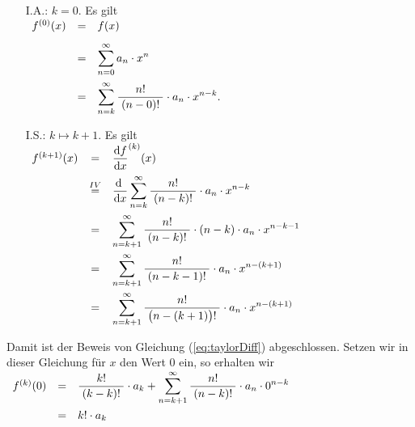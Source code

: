 \begin{enumerate}
\item[I.A.:] $k = 0$. \quad Es gilt \\[0.3cm]
              \hspace*{1.3cm}
              $
              \begin{array}[t]{lcl}              
              f^{(0)}(x) & = & f(x) \\[0.3cm]
                         & = & \displaystyle\sum\limits_{n=0}^\infty a_n \cdot x^{n} \\[0.5cm]
                         & = & \displaystyle\sum\limits_{n=k}^\infty \displaystyle\frac{\;\displaystyle n!\;}{\;\displaystyle(n-0)!\;} \cdot a_n \cdot x^{n-k}.
              \end{array}
              $ 
\item[I.S.:] $k \mapsto k + 1$.  \quad Es gilt 
             \\[0.3cm]
             \hspace*{1.3cm}
             $
             \begin{array}[t]{lcl}
             f^{(k+1)}(x) & = & \displaystyle\frac{\textrm{d}f}{\textrm{d}x}^{(k)}(x) \\[0.3cm]
             & \stackrel{IV}{=} & 
               \displaystyle \displaystyle\frac{\textrm{d}\;}{\textrm{d}x} \sum\limits_{n=k}^\infty \displaystyle\frac{\;\displaystyle n!\;}{\;\displaystyle(n-k)!\;} \cdot a_n \cdot x^{n-k} 
             \\[0.5cm]
             & = & \displaystyle\sum\limits_{n=k+1}^\infty \displaystyle\frac{\;\displaystyle n!\;}{\;\displaystyle(n-k)!\;} \cdot (n-k) \cdot a_n \cdot x^{n-k-1} 
                   \\[0.5cm]
             & = & \displaystyle\sum\limits_{n=k+1}^\infty \displaystyle\frac{\;\displaystyle n!\;}{\;\displaystyle(n-k-1)!\;} \cdot a_n \cdot x^{n-(k+1)} 
                   \\[0.5cm]
             & = & \displaystyle\sum\limits_{n=k+1}^\infty \displaystyle\frac{\;\displaystyle n!\;}{\;\displaystyle\bigl(n-(k+1)\bigr)!\;} \cdot a_n \cdot x^{n-(k+1)} 
             \end{array}
             $
\end{enumerate}
Damit ist der Beweis von Gleichung (\ref{eq:taylorDiff}) abgeschlossen.
Setzen wir in dieser Gleichung f\"ur $x$ den Wert $0$ ein, so erhalten wir 
\\[0.3cm]
\hspace*{1.3cm}
$
\begin{array}[t]{lcl}
f^{(k)}(0) & = & \displaystyle\frac{\;\displaystyle k!\;}{\;\displaystyle(k-k)!\;} \cdot a_k  + 
                 \sum\limits_{n=k+1}^\infty \displaystyle\frac{\;\displaystyle n!\;}{\;\displaystyle(n-k)!\;} \cdot a_n \cdot 0^{n-k} 
                 \\[0.5cm]
           & = & k! \cdot a_k  
\end{array}
$
\\[0.3cm]
